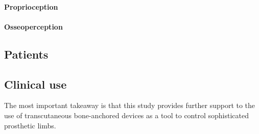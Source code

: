 \paragraph{Proprioception}


\paragraph{Osseoperception}

\subsection{Patients}


\subsection{Clinical use}

The most important takeaway is that this study provides further support to the use of transcutaneous bone-anchored devices as a tool to control sophisticated prosthetic limbs.